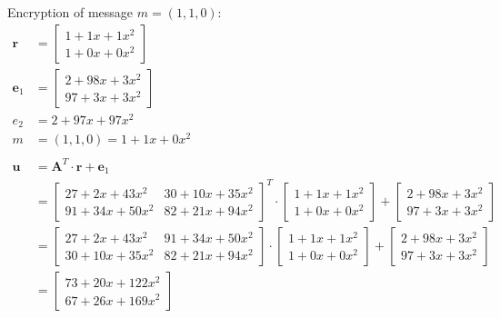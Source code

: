 Encryption of message $m=(1,1,0)$:
\begin{align*}
  \textbf{r}   & = \begin{bmatrix}1+1x+1x^2 \\ 1+0x+0x^2 \end{bmatrix}                                       \\
  \textbf{e}_1 & = \begin{bmatrix}2+98x+3x^2 \\ 97+3x+3x^2 \end{bmatrix}                                     \\
  e_2          & = 2+97x+97x^2                                                                               \\
  m            & =(1,1,0) = 1+1x+0x^2                                                                        \\
  \\
  \textbf{u}   & = \textbf{A}^T \cdot \textbf{r} + \textbf{e}_1                                              \\
               & = \begin{bmatrix}27+2x+43x^2 & 30+10x+35x^2 \\ 91+34x+50x^2 & 82+21x+94x^2 \end{bmatrix}^T
  \cdot
  \begin{bmatrix}1+1x+1x^2 \\ 1+0x+0x^2 \end{bmatrix}
  +
  \begin{bmatrix}2+98x+3x^2 \\ 97+3x+3x^2 \end{bmatrix}                                                      \\
               & = \begin{bmatrix}27+2x+43x^2 & 91+34x+50x^2 \\ 30+10x+35x^2  & 82+21x+94x^2 \end{bmatrix}
  \cdot
  \begin{bmatrix}1+1x+1x^2 \\ 1+0x+0x^2 \end{bmatrix}
  +
  \begin{bmatrix}2+98x+3x^2 \\ 97+3x+3x^2 \end{bmatrix}                                                      \\
               & = \begin{bmatrix}73+20x+122x^2 \\ 67+26x+169x^2 \end{bmatrix}

\end{align*}
